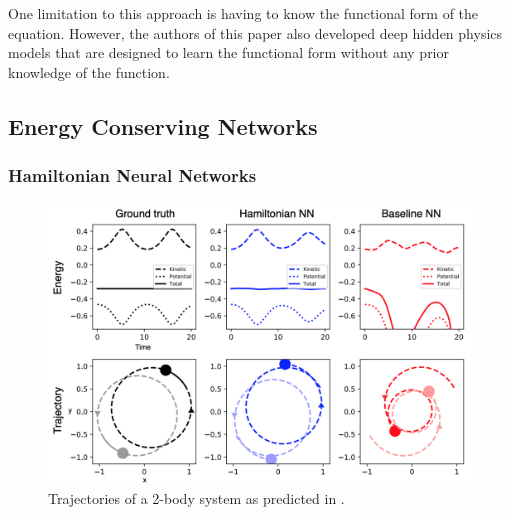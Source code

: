 \documentclass{article}
\begin{document}
One limitation to this approach is having to know the functional form of the equation. However, the authors of this paper also developed deep hidden physics models \cite{raissi_physics-informed_2019} that are designed to learn the functional form without any prior knowledge of the function. 

\subsection{Energy Conserving Networks}

\subsubsection{Hamiltonian Neural Networks}
\label{HNN}
\begin{figure}[h]
\centering
\includegraphics[width=\textwidth]{figures/3hnn.png}
\caption{Trajectories of a 2-body system as predicted in \cite{greydanus_hamiltonian_2019}.}
\end{figure}
\end{document}
